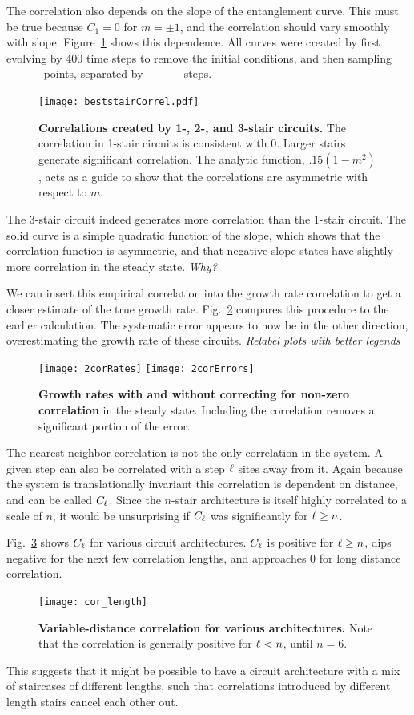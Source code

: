 The correlation also depends on the slope of the entanglement curve. This must be true because $C_1=0$ for $m=\pm1$, and the correlation should vary smoothly with slope. Figure~\ref{fig:steadystate} shows this dependence. All curves were created by first evolving by 400 time steps to remove the initial conditions, and then sampling \_\_\_\_ points, separated by \_\_\_\_ steps.
\begin{figure}
	\centering
	\texttt{[image: beststairCorrel.pdf]}
	\caption{\textbf{Correlations created by 1-, 2-, and 3-stair circuits.} The correlation in 1-stair circuits is consistent with 0. Larger stairs generate significant correlation. The analytic function, $.15(1-m^2)$, acts as a guide to show that the correlations are asymmetric with respect to $m$.}
	\label{fig:steadystate}
\end{figure}

The 3-stair circuit indeed generates more correlation than the 1-stair circuit. The solid curve is a simple quadratic function of the slope, which shows that the correlation function is asymmetric, and that negative slope states have slightly more correlation in the steady state. \emph{Why?}

We can insert this empirical correlation into the growth rate correlation to get a closer estimate of the true growth rate. Fig.~\ref{fig:2corRates} compares this procedure to the earlier calculation. The systematic error appears to now be in the other direction, overestimating the growth rate of these circuits.
\emph{Relabel plots with better legends}
\begin{figure}
	\centering
	\texttt{[image: 2corRates]}
	\texttt{[image: 2corErrors]}
	\caption{\textbf{Growth rates with and without correcting for non-zero correlation} in the steady state. Including the correlation removes a significant portion of the error.}
	\label{fig:2corRates}
\end{figure}

The nearest neighbor correlation is not the only correlation in the system. A given step can also be correlated with a step $\ell$ sites away from it. Again because the system is translationally invariant this correlation is dependent on distance, and can be called $C_\ell$. Since the $n$-stair architecture is itself highly correlated to a scale of $n$, it would be unsurprising if $C_\ell$ was significantly for $\ell\ge n$. 

Fig.~\ref{fig:cor_length} shows $C_\ell$ for various circuit architectures. $C_\ell$ is positive for $\ell\ge n$, dips negative for the next few correlation lengths, and approaches 0 for long distance correlation.
\begin{figure}
	\centering
	\texttt{[image: cor\_length]}
	\caption{\textbf{Variable-distance correlation for various architectures.} Note that the correlation is generally positive for $\ell<n$, until $n=6$.}
	\label{fig:cor_length}
\end{figure}
This suggests that it might be possible to have a circuit architecture with a mix of staircases of different lengths, such that correlations introduced by different length stairs cancel each other out.

